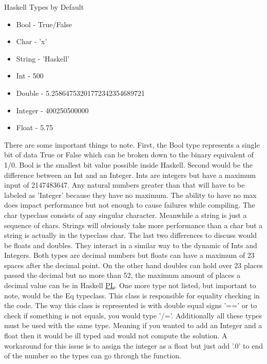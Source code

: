 \documentclass{article}
\begin{document}
    \caption{Haskell Types by Default}
    \begin{itemize}
              \item Bool - True/False
              \item Char - 'x'
              \item String - 'Haskell'
              \item Int - 500
              \item Double - 5.25864753201772342354689721
              \item Integer - 400250500000
              \item Float - 5.75
    \end{itemize}
    
    There are some important things to note. First, the Bool type represents a single bit of data True or False which can be broken down to the binary equivalent of 1/0. Bool is the smallest bit value possible inside Haskell. Second would be the difference between an Int and an Integer. Ints are integers but have a maximum input of 2147483647. Any natural numbers greater than that will have to be labeled as 'Integer' because they have no maximum. The ability to have no max does impact performance but not enough to cause failures while compiling. The char typeclass consists of any singular character. Meanwhile a string is just a sequence of chars. Strings will obviously take more performance than a char but a string is actually in the typeclass char. The last two differences to discuss would be floats and doubles. They interact in a similar way to the dynamic of Ints and Integers. Both types are decimal numbers but floats can have a maximum of 23 spaces after the decimal point. On the other hand doubles can hold over 23 places passed the decimal but no more than 52, the maximum amount of places a decimal value can be in Haskell \href{PL}{PL}. One more type not listed, but important to note, would be the Eq typeclass. This class is responsible for equality checking in the code. The way this class is represented is with double equal signs '==' or to check if something is not equals, you would type '/='. Additionally all these types must be used with the same type. Meaning if you wanted to add an Integer and a float then it would be ill typed and would not compute the solution. A workaround for this issue is to assign the integer as a float but just add '.0' to end of the number so the types can go through the function. 
            
    
\end{document}
